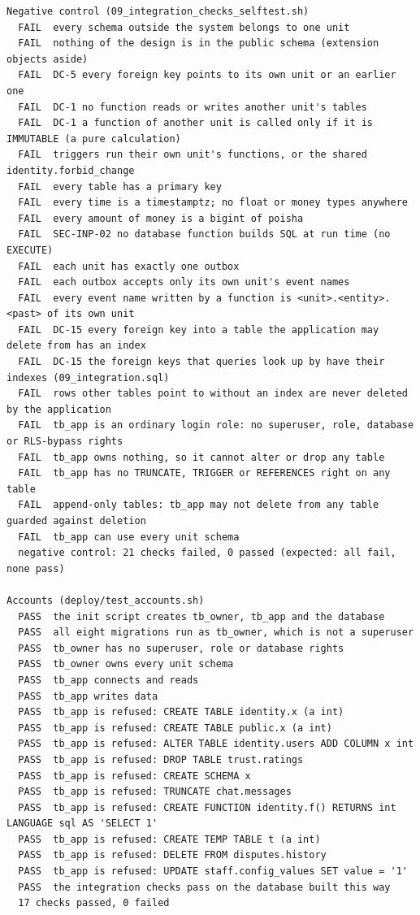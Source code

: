 \documentclass[11pt,a4paper]{article}
\begin{document}
{\begin{verbatim}
Negative control (09_integration_checks_selftest.sh)
  FAIL  every schema outside the system belongs to one unit
  FAIL  nothing of the design is in the public schema (extension objects aside)
  FAIL  DC-5 every foreign key points to its own unit or an earlier one
  FAIL  DC-1 no function reads or writes another unit's tables
  FAIL  DC-1 a function of another unit is called only if it is IMMUTABLE (a pure calculation)
  FAIL  triggers run their own unit's functions, or the shared identity.forbid_change
  FAIL  every table has a primary key
  FAIL  every time is a timestamptz; no float or money types anywhere
  FAIL  every amount of money is a bigint of poisha
  FAIL  SEC-INP-02 no database function builds SQL at run time (no EXECUTE)
  FAIL  each unit has exactly one outbox
  FAIL  each outbox accepts only its own unit's event names
  FAIL  every event name written by a function is <unit>.<entity>.<past> of its own unit
  FAIL  DC-15 every foreign key into a table the application may delete from has an index
  FAIL  DC-15 the foreign keys that queries look up by have their indexes (09_integration.sql)
  FAIL  rows other tables point to without an index are never deleted by the application
  FAIL  tb_app is an ordinary login role: no superuser, role, database or RLS-bypass rights
  FAIL  tb_app owns nothing, so it cannot alter or drop any table
  FAIL  tb_app has no TRUNCATE, TRIGGER or REFERENCES right on any table
  FAIL  append-only tables: tb_app may not delete from any table guarded against deletion
  FAIL  tb_app can use every unit schema
  negative control: 21 checks failed, 0 passed (expected: all fail, none pass)

Accounts (deploy/test_accounts.sh)
  PASS  the init script creates tb_owner, tb_app and the database
  PASS  all eight migrations run as tb_owner, which is not a superuser
  PASS  tb_owner has no superuser, role or database rights
  PASS  tb_owner owns every unit schema
  PASS  tb_app connects and reads
  PASS  tb_app writes data
  PASS  tb_app is refused: CREATE TABLE identity.x (a int)
  PASS  tb_app is refused: CREATE TABLE public.x (a int)
  PASS  tb_app is refused: ALTER TABLE identity.users ADD COLUMN x int
  PASS  tb_app is refused: DROP TABLE trust.ratings
  PASS  tb_app is refused: CREATE SCHEMA x
  PASS  tb_app is refused: TRUNCATE chat.messages
  PASS  tb_app is refused: CREATE FUNCTION identity.f() RETURNS int LANGUAGE sql AS 'SELECT 1'
  PASS  tb_app is refused: CREATE TEMP TABLE t (a int)
  PASS  tb_app is refused: DELETE FROM disputes.history
  PASS  tb_app is refused: UPDATE staff.config_values SET value = '1'
  PASS  the integration checks pass on the database built this way
  17 checks passed, 0 failed


\end{verbatim}}
\end{document}
